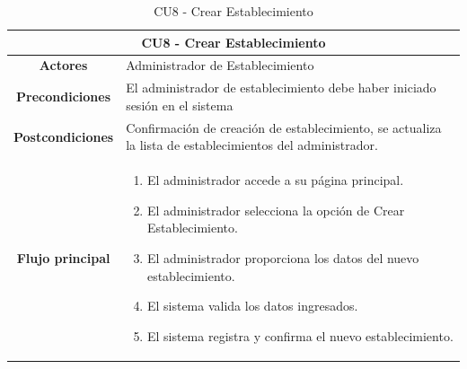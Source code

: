 \begin{table}[h]
    \centering
    \begin{tabular}{|c|p{10cm}|}
        \hline
        \multicolumn{2}{|c|}{\textbf{CU8 - Crear Establecimiento }}                                                                          \\
        \hline
        \textbf{Actores}         & Administrador de Establecimiento                                                                          \\
        \hline
        \textbf{Precondiciones}  & El administrador de establecimiento debe haber iniciado sesión en el sistema                              \\
        \hline
        \textbf{Postcondiciones} & Confirmación de creación de establecimiento, se actualiza la lista de establecimientos del administrador. \\
        \hline
        \textbf{Flujo principal} & \begin{enumerate}
                                       \item El administrador accede a su página principal.
                                       \item El administrador selecciona la opción de Crear Establecimiento.
                                       \item El administrador proporciona los datos del nuevo establecimiento.
                                       \item El sistema valida los datos ingresados.
                                       \item El sistema registra y confirma el nuevo establecimiento.
                                   \end{enumerate}                                    \\
        \hline
    \end{tabular}
    \caption{CU8 - Crear Establecimiento }
\end{table}

